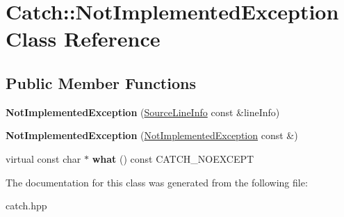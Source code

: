 \hypertarget{classCatch_1_1NotImplementedException}{
\section{Catch::NotImplementedException Class Reference}
\label{classCatch_1_1NotImplementedException}
}
\subsection*{Public Member Functions}
\begin{DoxyCompactItemize}
\item 
\hypertarget{classCatch_1_1NotImplementedException_ab4f0a5c39d8ffb72c664e2c07e180634}{
{\bfseries NotImplementedException} (\hyperlink{structCatch_1_1SourceLineInfo}{SourceLineInfo} const \&lineInfo)}
\label{classCatch_1_1NotImplementedException_ab4f0a5c39d8ffb72c664e2c07e180634}

\item 
\hypertarget{classCatch_1_1NotImplementedException_a508a7a833455da2d3c10ea1a9d45e982}{
{\bfseries NotImplementedException} (\hyperlink{classCatch_1_1NotImplementedException}{NotImplementedException} const \&)}
\label{classCatch_1_1NotImplementedException_a508a7a833455da2d3c10ea1a9d45e982}

\item 
\hypertarget{classCatch_1_1NotImplementedException_ad4c13963f1a8feacda0cd331adda89e3}{
virtual const char $\ast$ {\bfseries what} () const CATCH\_\-NOEXCEPT}
\label{classCatch_1_1NotImplementedException_ad4c13963f1a8feacda0cd331adda89e3}

\end{DoxyCompactItemize}


The documentation for this class was generated from the following file:\begin{DoxyCompactItemize}
\item 
catch.hpp\end{DoxyCompactItemize}

